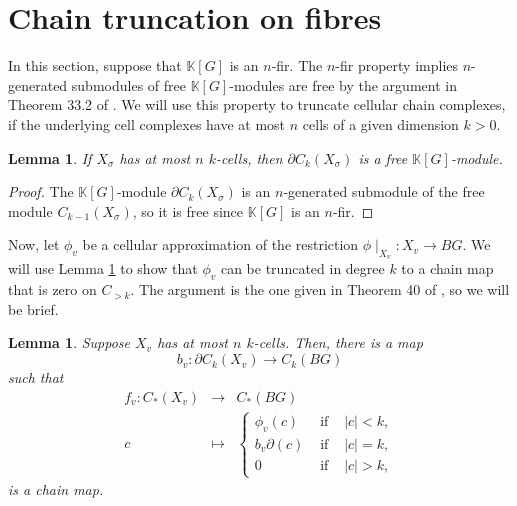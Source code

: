 \documentclass[11pt,letterpaper]{amsart}
\newtheorem{lemma}[theorem]{Lemma}
\newtheorem*{remark}{Remark}
\begin{document}
\section{Chain truncation on fibres\label{chaintruncation}}
In this section, suppose that $\mathbb K[G]$ is an $n$-fir. The $n$-fir property implies $n$-generated submodules of free $\mathbb K[G]$-modules are free by the argument in Theorem 33.2 of \cite{avramididelzanthyperbolic}. We will use this property to truncate cellular chain complexes, if the underlying cell complexes have at most $n$ cells of a given dimension $k>0$.
\begin{lemma}
\label{freelemma}
If $X_{\sigma}$ has at most $n$ $k$-cells, then $\partial C_{k}(X_\sigma)$ is a free $\mathbb K[G]$-module. 
\end{lemma}
\begin{proof}
The $\mathbb K[G]$-module $\partial C_{k}(X_{\sigma})$ is an $n$-generated submodule of the free module 
$C_{k-1}(X_\sigma)$, so it is free since $\mathbb K[G]$ is an $n$-fir. 
\end{proof}
Now, let $\phi_v$ be a cellular approximation of the restriction $\phi\mid_{X_v}:X_v\rightarrow BG$. We will use Lemma \ref{freelemma} to show that $\phi_v$ can be truncated in degree $k$ to a chain map that is zero on $C_{>k}$. The argument is the one given in Theorem 40 of \cite{avramididelzanthyperbolic}, so we will be brief. 
\begin{lemma}
\label{vertexchainmap}%
Suppose $X_v$ has at most $n$ $k$-cells. Then, there is a map $$b_v:\partial C_{k}(X_v)\rightarrow C_{k}(BG)$$ such that %
\begin{eqnarray*}
f_v:C_*(X_v)&\rightarrow& C_*(BG)\\
c&\mapsto&\left\{
\begin{array}{ccc}
\phi_v(c)&\mbox{ if }&|c|<k,\\
b_{v}\partial (c)&\mbox{ if }&|c|=k,\\
0&\mbox{ if }&|c|>k,
\end{array}\right.
\end{eqnarray*}
is a chain map.
\end{lemma}
\end{document}
